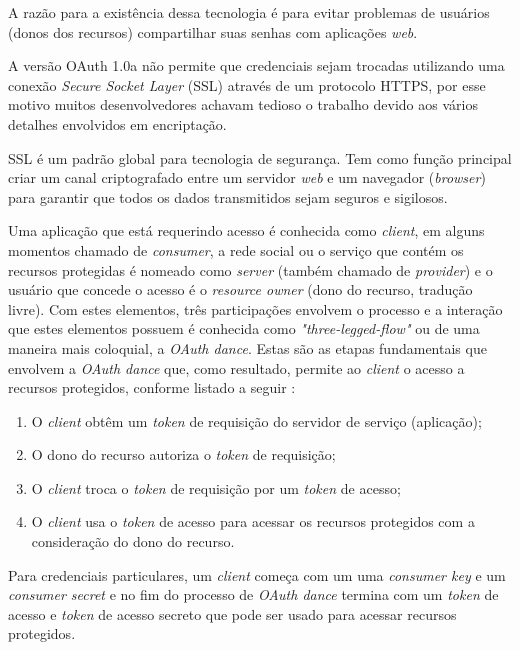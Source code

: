 A razão para a existência dessa tecnologia é para evitar problemas de usuários (donos dos recursos) compartilhar suas senhas com aplicações \textit{web}.

A versão OAuth 1.0a não permite que credenciais sejam trocadas utilizando uma conexão \textit{Secure Socket Layer} (SSL) através de um protocolo HTTPS, por esse motivo muitos desenvolvedores achavam tedioso o trabalho devido aos vários detalhes envolvidos em encriptação.

SSL é um padrão global para tecnologia de segurança. Tem como função principal criar um canal criptografado entre um servidor \textit{web} e um navegador (\textit{browser}) para garantir que todos os dados transmitidos sejam seguros e sigilosos.

Uma aplicação que está requerindo acesso é conhecida como \textit{client}, em alguns momentos chamado de \textit{consumer}, a rede social ou o serviço que contém os recursos protegidas é nomeado como \textit{server} (também chamado de \textit{provider}) e o usuário que concede o acesso é o \textit{resource owner} (dono do recurso, tradução livre). Com estes elementos, três participações envolvem o processo e a interação que estes elementos possuem é conhecida como \textit{"three-legged-flow"} ou de uma maneira mais coloquial, a \textit{OAuth dance}. Estas são as etapas fundamentais que envolvem a \textit{OAuth dance} que, como resultado, permite ao \textit{client} o acesso a recursos protegidos, conforme listado a seguir \cite{mining-social-web}:

\begin{enumerate}
	\item O \textit{client} obtêm um \textit{token} de requisição do servidor de serviço (aplicação);
	\item O dono do recurso autoriza o \textit{token} de requisição;
	\item O \textit{client} troca o \textit{token} de requisição por um \textit{token} de acesso;
	\item O \textit{client} usa o \textit{token} de acesso para acessar os recursos protegidos com a consideração do dono do recurso.
\end{enumerate}

Para credenciais particulares, um \textit{client} começa com um uma \textit{consumer key} e um \textit{consumer secret} e no fim do processo de \textit{OAuth dance} termina com um \textit{token} de acesso e \textit{token} de acesso secreto que pode ser usado para acessar recursos protegidos.

